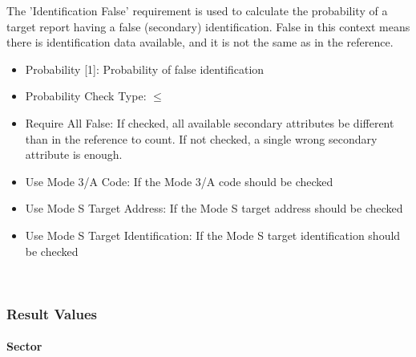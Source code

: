 The 'Identification False' requirement is used to calculate the probability of a target report having a false (secondary) identification. False in this context means there is identification data available, and it is not the same as in the reference. \\

\begin{itemize}  
\item Probability [1]: Probability of false identification
\item Probability Check Type: $\leq$
\item Require All False: If checked, all available secondary attributes be different than in the reference to count. If not checked, a single wrong secondary attribute is enough.
\item Use Mode 3/A Code: If the Mode 3/A code should be checked
\item Use Mode S Target Address: If the Mode S target address should be checked
\item Use Mode S Target Identification: If the Mode S target identification should be checked
\end{itemize}
\ \\

\subsubsection{Result Values}

\paragraph{Sector}

